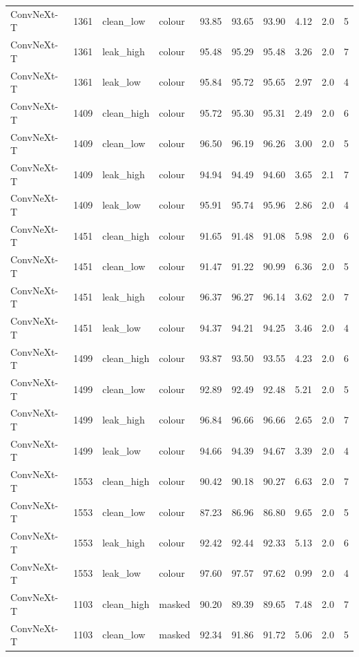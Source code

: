 {\begin{longtable}{lrllrrrrrr}
ConvNeXt-T & 1361 & clean\_low & colour & 93.85 & 93.65 & 93.90 & 4.12 & 2.0 & 5 \\
ConvNeXt-T & 1361 & leak\_high & colour & 95.48 & 95.29 & 95.48 & 3.26 & 2.0 & 7 \\
ConvNeXt-T & 1361 & leak\_low & colour & 95.84 & 95.72 & 95.65 & 2.97 & 2.0 & 4 \\
ConvNeXt-T & 1409 & clean\_high & colour & 95.72 & 95.30 & 95.31 & 2.49 & 2.0 & 6 \\
ConvNeXt-T & 1409 & clean\_low & colour & 96.50 & 96.19 & 96.26 & 3.00 & 2.0 & 5 \\
ConvNeXt-T & 1409 & leak\_high & colour & 94.94 & 94.49 & 94.60 & 3.65 & 2.1 & 7 \\
ConvNeXt-T & 1409 & leak\_low & colour & 95.91 & 95.74 & 95.96 & 2.86 & 2.0 & 4 \\
ConvNeXt-T & 1451 & clean\_high & colour & 91.65 & 91.48 & 91.08 & 5.98 & 2.0 & 6 \\
ConvNeXt-T & 1451 & clean\_low & colour & 91.47 & 91.22 & 90.99 & 6.36 & 2.0 & 5 \\
ConvNeXt-T & 1451 & leak\_high & colour & 96.37 & 96.27 & 96.14 & 3.62 & 2.0 & 7 \\
ConvNeXt-T & 1451 & leak\_low & colour & 94.37 & 94.21 & 94.25 & 3.46 & 2.0 & 4 \\
ConvNeXt-T & 1499 & clean\_high & colour & 93.87 & 93.50 & 93.55 & 4.23 & 2.0 & 6 \\
ConvNeXt-T & 1499 & clean\_low & colour & 92.89 & 92.49 & 92.48 & 5.21 & 2.0 & 5 \\
ConvNeXt-T & 1499 & leak\_high & colour & 96.84 & 96.66 & 96.66 & 2.65 & 2.0 & 7 \\
ConvNeXt-T & 1499 & leak\_low & colour & 94.66 & 94.39 & 94.67 & 3.39 & 2.0 & 4 \\
ConvNeXt-T & 1553 & clean\_high & colour & 90.42 & 90.18 & 90.27 & 6.63 & 2.0 & 7 \\
ConvNeXt-T & 1553 & clean\_low & colour & 87.23 & 86.96 & 86.80 & 9.65 & 2.0 & 5 \\
ConvNeXt-T & 1553 & leak\_high & colour & 92.42 & 92.44 & 92.33 & 5.13 & 2.0 & 6 \\
ConvNeXt-T & 1553 & leak\_low & colour & 97.60 & 97.57 & 97.62 & 0.99 & 2.0 & 4 \\
ConvNeXt-T & 1103 & clean\_high & masked & 90.20 & 89.39 & 89.65 & 7.48 & 2.0 & 7 \\
ConvNeXt-T & 1103 & clean\_low & masked & 92.34 & 91.86 & 91.72 & 5.06 & 2.0 & 5 \\

\end{longtable}}
